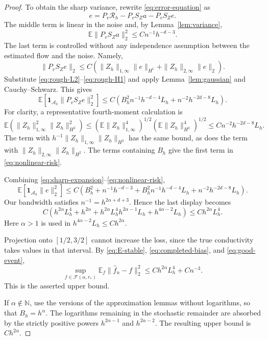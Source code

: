 \documentclass[11pt]{article}
\theoremstyle{remark}
\newcommand{\E}{\mathbb E}
\newcommand{\one}{\mathbf 1}
\newcommand{\cF}{\mathcal F}
\begin{document}
\begin{proof}
To obtain the sharp variance, rewrite \eqref{eq:error-equation} as
\begin{equation}\label{eq:sharp-expansion}
e=P_v\mathcal R_h-P_vS_Za-P_vS_Ze.
\end{equation}
The middle term is linear in the noise and, by
Lemma~\ref{lem:variance},
\begin{equation}\label{eq:linear-risk}
\E\|P_vS_Za\|_2^2\leq Cn^{-1}h^{-d-3}.
\end{equation}
The last term is controlled without any independence assumption
between the estimated flow and the noise. Namely,
\[
\|P_vS_Ze\|_2
\leq C\left(
\|Z_h\|_{1,\infty}\|e\|_{H^1}
+\|Z_h\|_{2,\infty}\|e\|_2
\right).
\]
Substitute \eqref{eq:rough-L2}--\eqref{eq:rough-H1} and apply
Lemma~\ref{lem:gaussian} and Cauchy--Schwarz. This gives
\begin{equation}\label{eq:nonlinear-risk}
\E\left[\one_{\mathcal A_h}\|P_vS_Ze\|_2^2\right]
\leq C\left(
B_h^2n^{-1}h^{-d-4}L_h
+n^{-2}h^{-2d-8}L_h
\right).
\end{equation}
For clarity, a representative fourth-moment calculation is
\[
\E\left(
\|Z_h\|_{1,\infty}^2\|Z_h\|_{H^3}^2
\right)
\leq
\left(\E\|Z_h\|_{1,\infty}^4\right)^{1/2}
\left(\E\|Z_h\|_{H^3}^4\right)^{1/2}
\leq Cn^{-2}h^{-2d-8}L_h.
\]
The term with
\(h^{-1}\|Z_h\|_{1,\infty}\|Z_h\|_{H^2}\)
has the same bound, as does the term with
\(\|Z_h\|_{2,\infty}\|Z_h\|_{H^2}\).
The terms containing \(B_h\) give the first term in
\eqref{eq:nonlinear-risk}.

Combining \eqref{eq:sharp-expansion}--\eqref{eq:nonlinear-risk},
\[
\E[\one_{\mathcal A_h}\|e\|_2^2]
\leq C\left(
B_h^2+n^{-1}h^{-d-3}
+B_h^2n^{-1}h^{-d-4}L_h
+n^{-2}h^{-2d-8}L_h
\right).
\]
Our bandwidth satisfies \(n^{-1}=h^{2\alpha+d+3}\). Hence the last
display becomes
\[
C\left(
h^{2\alpha}L_h^4+h^{2\alpha}
+h^{2\alpha}L_h^4 h^{2\alpha-1}L_h
+h^{4\alpha-2}L_h
\right)
\leq Ch^{2\alpha}L_h^4.
\]
Here \(\alpha>1\) is used in
\(h^{4\alpha-2}L_h\leq Ch^{2\alpha}\).

Projection onto \([1/2,3/2]\) cannot increase the loss, since the
true conductivity takes values in that interval. By
\eqref{eq:E-stable}, \eqref{eq:completed-bias}, and
\eqref{eq:good-event},
\[
\sup_{f\in\cF(\alpha,r_*)}
\E_f\|\widehat f_n-f\|_2^2
\leq Ch^{2\alpha}L_h^4+Cn^{-3}.
\]
This is the asserted upper bound.

If \(\alpha\notin\mathbb N\), use the versions of the approximation
lemmas without logarithms, so that \(B_h=h^\alpha\).
The logarithms remaining in the stochastic remainder are absorbed
by the strictly positive powers \(h^{2\alpha-1}\) and
\(h^{2\alpha-2}\). The resulting upper bound is \(Ch^{2\alpha}\).
\end{proof}
\end{document}
